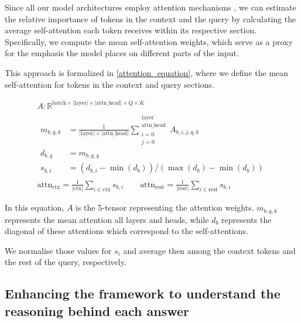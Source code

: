 Since all our model architectures employ attention mechanisms \citep{flant5,llama3}, we can estimate the relative importance of tokens in the context and the query by calculating the average self-attention each token receives within its respective section.
Specifically, we compute the mean self-attention weights, which serve as a proxy for the emphasis the model places on different parts of the input.

This approach is formalized in \cref{attention_equation}, where we define the mean self-attention for tokens in the context and query sections.

\begin{equation}
	\newcommand{\lenmod}[1]{\left| \text{#1} \right|}
	\begin{gathered}
		A : \mathbb{R} ^ { \text{batch} \times \lenmod{layer}  \times \lenmod{attn\_head} \times Q \times K } \\[1ex]
		\begin{aligned}
			m_{b,q,k} &= \frac{1}{ \lenmod{layer} \times \lenmod{attn\_head} } \sum^{\substack{\text{layer} \\ \text{attn\_head}}}_{\substack{i = 0 \\ j = 0}} A_{b,i,j,q,k} \\
			d_{b, q} &= m_{b, q, q} \\
			s_{b, i} &= \left(d_{b, i} - \min{\left( d_b \right)}\right) / \left(\max{\left( d_b \right)} - \min{\left( d_b \right)} \right)
		\end{aligned} \\[1em]
		\text{attn}_\text{ctx} = \frac{1}{\lenmod{ctx}} \sum_{i \in \text{ctx}} s_{b,i} \qquad
		\text{attn}_\text{rest} = \frac{1}{\lenmod{rest}} \sum_{i \in \text{rest}} s_{b,i} \qquad
	\end{gathered}
	\label{attention_equation}
\end{equation}

In this equation, $A$ is the 5-tensor representing the attention weights.
$m_{b,q,k}$ represents the mean attention all layers and heads, while $d_b$ represents the diagonal of these attentions which correspond to the self-attentions.

We normalise those values for $s_i$ and average then among the context tokens and the rest of the query, respectively.

\newpage{}

\subsection{Enhancing the framework to understand the reasoning behind each answer}
\label{method_perplexity}

